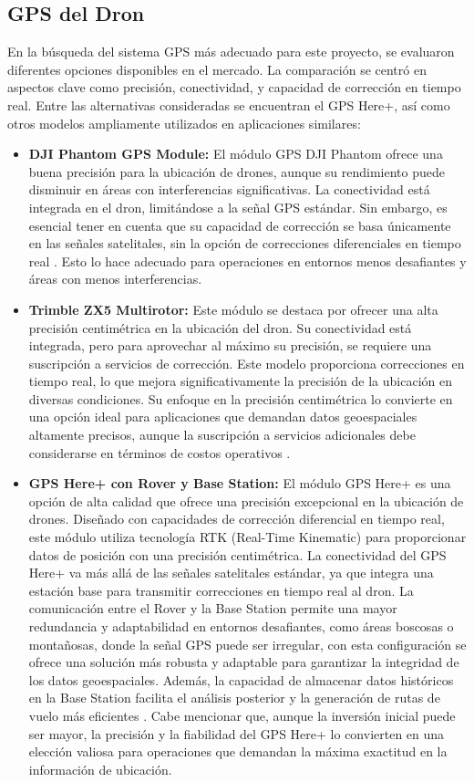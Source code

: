 \subsection{GPS del Dron}
En la búsqueda del sistema GPS más adecuado para este proyecto, se evaluaron diferentes opciones disponibles en el mercado. La comparación se centró en aspectos clave como precisión, conectividad, y capacidad de corrección en tiempo real. Entre las alternativas consideradas se encuentran el GPS Here+, así como otros modelos ampliamente utilizados en aplicaciones similares:
\begin{itemize}
\item \textbf{DJI Phantom GPS Module:}
El módulo GPS DJI Phantom ofrece una buena precisión para la ubicación de drones, aunque su rendimiento puede disminuir en áreas con interferencias significativas. La conectividad está integrada en el dron, limitándose a la señal GPS estándar. Sin embargo, es esencial tener en cuenta que su capacidad de corrección se basa únicamente en las señales satelitales, sin la opción de correcciones diferenciales en tiempo real \cite{phantom}. Esto lo hace adecuado para operaciones en entornos menos desafiantes y áreas con menos interferencias.
\item \textbf{Trimble ZX5 Multirotor:}
Este módulo se destaca por ofrecer una alta precisión centimétrica en la ubicación del dron. Su conectividad está integrada, pero para aprovechar al máximo su precisión, se requiere una suscripción a servicios de corrección. Este modelo proporciona correcciones en tiempo real, lo que mejora significativamente la precisión de la ubicación en diversas condiciones. Su enfoque en la precisión centimétrica lo convierte en una opción ideal para aplicaciones que demandan datos geoespaciales altamente precisos, aunque la suscripción a servicios adicionales debe considerarse en términos de costos operativos \cite{zx5}.
\item \textbf{GPS Here+ con Rover y Base Station:}
El módulo GPS Here+ es una opción de alta calidad que ofrece una precisión excepcional en la ubicación de drones. Diseñado con capacidades de corrección diferencial en tiempo real, este módulo utiliza tecnología RTK (Real-Time Kinematic) para proporcionar datos de posición con una precisión centimétrica. La conectividad del GPS Here+ va más allá de las señales satelitales estándar, ya que integra una estación base para transmitir correcciones en tiempo real al dron. La comunicación entre el Rover y la Base Station permite una mayor redundancia y adaptabilidad en entornos desafiantes, como áreas boscosas o montañosas, donde la señal GPS puede ser irregular, con esta configuración se ofrece una solución más robusta y adaptable para garantizar la integridad de los datos geoespaciales. Además, la capacidad de almacenar datos históricos en la Base Station facilita el análisis posterior y la generación de rutas de vuelo más eficientes \cite{here}. Cabe mencionar que, aunque la inversión inicial puede ser mayor, la precisión y la fiabilidad del GPS Here+ lo convierten en una elección valiosa para operaciones que demandan la máxima exactitud en la información de ubicación.
\end{itemize}
